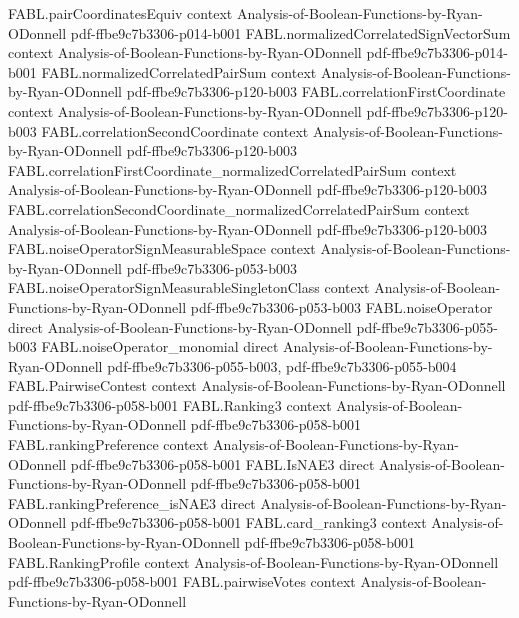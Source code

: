\begin{theorem}
\proofstep
  {FABL.pairCoordinatesEquiv}
  {context}
  {Analysis-of-Boolean-Functions-by-Ryan-ODonnell}
  {pdf-ffbe9c7b3306-p014-b001}
\proofstep
  {FABL.normalizedCorrelatedSignVectorSum}
  {context}
  {Analysis-of-Boolean-Functions-by-Ryan-ODonnell}
  {pdf-ffbe9c7b3306-p014-b001}
\proofstep
  {FABL.normalizedCorrelatedPairSum}
  {context}
  {Analysis-of-Boolean-Functions-by-Ryan-ODonnell}
  {pdf-ffbe9c7b3306-p120-b003}
\proofstep
  {FABL.correlationFirstCoordinate}
  {context}
  {Analysis-of-Boolean-Functions-by-Ryan-ODonnell}
  {pdf-ffbe9c7b3306-p120-b003}
\proofstep
  {FABL.correlationSecondCoordinate}
  {context}
  {Analysis-of-Boolean-Functions-by-Ryan-ODonnell}
  {pdf-ffbe9c7b3306-p120-b003}
\proofstep
  {FABL.correlationFirstCoordinate_normalizedCorrelatedPairSum}
  {context}
  {Analysis-of-Boolean-Functions-by-Ryan-ODonnell}
  {pdf-ffbe9c7b3306-p120-b003}
\proofstep
  {FABL.correlationSecondCoordinate_normalizedCorrelatedPairSum}
  {context}
  {Analysis-of-Boolean-Functions-by-Ryan-ODonnell}
  {pdf-ffbe9c7b3306-p120-b003}
\proofstep
  {FABL.noiseOperatorSignMeasurableSpace}
  {context}
  {Analysis-of-Boolean-Functions-by-Ryan-ODonnell}
  {pdf-ffbe9c7b3306-p053-b003}
\proofstep
  {FABL.noiseOperatorSignMeasurableSingletonClass}
  {context}
  {Analysis-of-Boolean-Functions-by-Ryan-ODonnell}
  {pdf-ffbe9c7b3306-p053-b003}
\proofstep
  {FABL.noiseOperator}
  {direct}
  {Analysis-of-Boolean-Functions-by-Ryan-ODonnell}
  {pdf-ffbe9c7b3306-p055-b003}
\proofstep
  {FABL.noiseOperator_monomial}
  {direct}
  {Analysis-of-Boolean-Functions-by-Ryan-ODonnell}
  {pdf-ffbe9c7b3306-p055-b003,
    pdf-ffbe9c7b3306-p055-b004}
\proofstep
  {FABL.PairwiseContest}
  {context}
  {Analysis-of-Boolean-Functions-by-Ryan-ODonnell}
  {pdf-ffbe9c7b3306-p058-b001}
\proofstep
  {FABL.Ranking3}
  {context}
  {Analysis-of-Boolean-Functions-by-Ryan-ODonnell}
  {pdf-ffbe9c7b3306-p058-b001}
\proofstep
  {FABL.rankingPreference}
  {context}
  {Analysis-of-Boolean-Functions-by-Ryan-ODonnell}
  {pdf-ffbe9c7b3306-p058-b001}
\proofstep
  {FABL.IsNAE3}
  {direct}
  {Analysis-of-Boolean-Functions-by-Ryan-ODonnell}
  {pdf-ffbe9c7b3306-p058-b001}
\proofstep
  {FABL.rankingPreference_isNAE3}
  {direct}
  {Analysis-of-Boolean-Functions-by-Ryan-ODonnell}
  {pdf-ffbe9c7b3306-p058-b001}
\proofstep
  {FABL.card_ranking3}
  {context}
  {Analysis-of-Boolean-Functions-by-Ryan-ODonnell}
  {pdf-ffbe9c7b3306-p058-b001}
\proofstep
  {FABL.RankingProfile}
  {context}
  {Analysis-of-Boolean-Functions-by-Ryan-ODonnell}
  {pdf-ffbe9c7b3306-p058-b001}
\proofstep
  {FABL.pairwiseVotes}
  {context}
  {Analysis-of-Boolean-Functions-by-Ryan-ODonnell}

\end{theorem}
